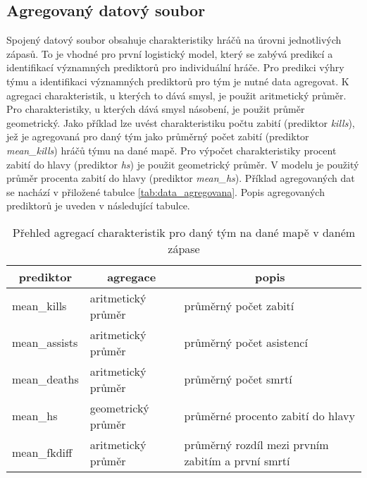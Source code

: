\subsection{Agregovaný datový soubor} \label{sec:agregovany_datovy_soubor}
Spojený datový soubor obsahuje charakteristiky hráčů na úrovni jednotlivých zápasů. To je vhodné pro první logistický model, který se zabývá predikcí a identifikací
významných prediktorů pro individuální hráče. Pro predikci výhry týmu a identifikaci významných prediktorů pro tým je nutné data agregovat. K agregaci charakteristik, u kterých
to dává smysl, je použit aritmetický průměr. Pro charakteristiky, u kterých dává smysl násobení, je použit průměr geometrický. Jako příklad lze uvést charakteristiku 
počtu zabití (prediktor \textit{kills}), jež je agregovaná pro daný tým jako průměrný počet zabití (prediktor \textit{mean\_kills}) hráčů týmu na dané mapě. Pro výpočet
charakteristiky procent zabití do hlavy (prediktor \textit{hs}) je použit geometrický průměr. V modelu je použitý průměr procenta zabití do hlavy (prediktor \textit{mean\_hs}).
Příklad agregovaných dat se nachází v přiložené tabulce \ref{tab:data_agregovana}. Popis agregovaných prediktorů je uveden v následující tabulce.

\begin{table}[H]
    \centering
    \caption{Přehled agregací charakteristik pro daný tým na dané mapě v daném zápase}
    \begin{tabular}{|l|l|l|}
    \hline
    \multicolumn{1}{|c|}{prediktor} & \multicolumn{1}{c|}{agregace} & \multicolumn{1}{c|}{popis}                        \\ \hline
    mean\_kills                     & aritmetický průměr            & průměrný počet zabití                             \\ \hline
    mean\_assists                   & aritmetický průměr            & průměrný počet asistencí                          \\ \hline
    mean\_deaths                    & aritmetický průměr            & průměrný počet smrtí                              \\ \hline
    mean\_hs                        & geometrický průměr            & průměrné procento zabití do hlavy                 \\ \hline
    mean\_fkdiff                    & aritmetický průměr            & průměrný rozdíl mezi prvním zabitím a první smrtí \\ \hline
    \end{tabular}
\end{table}

